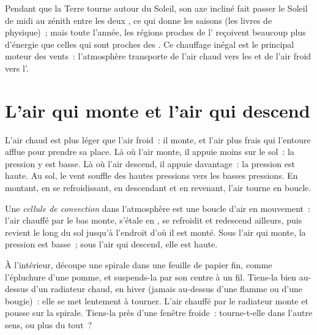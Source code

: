 Pendant que la Terre tourne autour du Soleil, son axe incliné fait passer
le Soleil de midi au zénith entre les deux , ce qui donne les
saisons (les livres de physique)~; mais toute l'année, les régions proches
de l' reçoivent beaucoup plus d'énergie que celles qui sont
proches des . Ce chauffage inégal est le principal moteur des
vents~: l'atmosphère transporte de l'air chaud vers les  et de l'air
froid vers l'.

\section{L'air qui monte et l'air qui descend}

L'air chaud est plus léger que l'air froid~: il monte, et l'air plus frais
qui l'entoure afflue pour prendre sa place. Là où l'air monte, il appuie
moins sur le sol~: la pression y est basse. Là où l'air descend, il
appuie davantage~: la pression est haute. Au sol, le vent souffle des
hautes pressions vers les basses pressions. En montant, en se refroidissant,
en descendant et en revenant, l'air tourne en boucle.

\begin{definition}\label{def:g8:winds-global-circulation:convection-cell}
Une \emph{cellule de convection} dans
l'atmosphère est une boucle d'air en mouvement~: l'air chauffé par le bas
monte, s'étale en , se refroidit et redescend ailleurs, puis
revient le long du sol jusqu'à l'endroit d'où il est monté. Sous l'air qui
monte, la pression est basse~; sous l'air qui descend, elle est haute.
\end{definition}

\begin{inthelab}
À l'intérieur, découpe une spirale dans une feuille de papier fin, comme
l'épluchure d'une pomme, et suspends-la par son centre à un fil. Tiens-la
bien au-dessus d'un radiateur chaud, en hiver (jamais au-dessus d'une
flamme ou d'une bougie)~: elle se met lentement à tourner. L'air chauffé
par le radiateur monte et pousse sur la spirale. Tiens-la près d'une
fenêtre froide~: tourne-t-elle dans l'autre sens, ou plus du tout~?
\end{inthelab}

